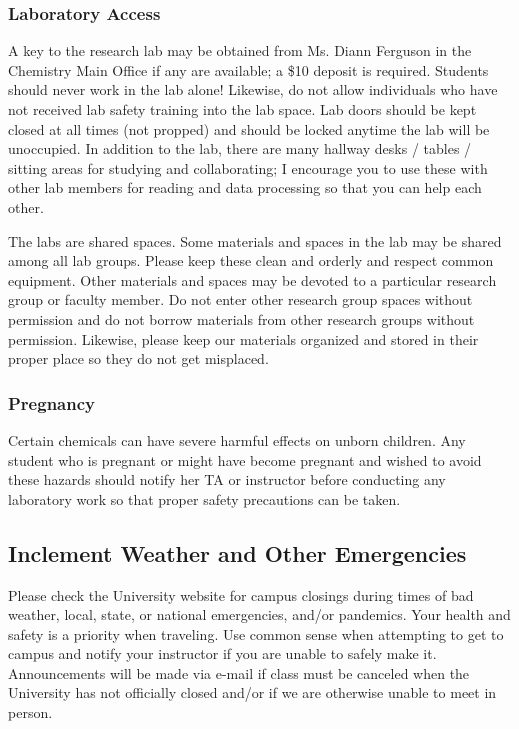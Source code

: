 \documentclass[11pt]{article}
\begin{document}
\subsubsection{Laboratory Access}
\label{sec:org42f803e}

A key to the research lab may be obtained from Ms. Diann Ferguson in the Chemistry Main Office if any are available; a \$10 deposit is required. Students should never work in the lab alone! Likewise, do not allow individuals who have not received lab safety training into the lab space. Lab doors should be kept closed at all times (not propped) and should be locked anytime the lab will be unoccupied. In addition to the lab, there are many hallway desks / tables / sitting areas for studying and collaborating; I encourage you to use these with other lab members for reading and data processing so that you can help each other.

The labs are shared spaces. Some materials and spaces in the lab may be shared among all lab groups. Please keep these clean and orderly and respect common equipment. Other materials and spaces may be devoted to a particular research group or faculty member. Do not enter other research group spaces without permission and do not borrow materials from other research groups without permission. Likewise, please keep our materials organized and stored in their proper place so they do not get misplaced.

\subsubsection{Pregnancy}
\label{sec:org87254f5}

Certain chemicals can have severe harmful effects on unborn children. Any student who is pregnant or might have become pregnant and wished to avoid these hazards should notify her TA or instructor before conducting any laboratory work so that proper safety precautions can be taken.

\subsection{Inclement Weather and Other Emergencies}
\label{sec:orgab7f539}

Please check the University website for campus closings during times of bad weather, local, state, or national emergencies, and/or pandemics. Your health and safety is a priority when traveling. Use common sense when attempting to get to campus and notify your instructor if you are unable to safely make it. Announcements will be made via e-mail if class must be canceled when the University has not officially closed and/or if we are otherwise unable to meet in person.
\end{document}
